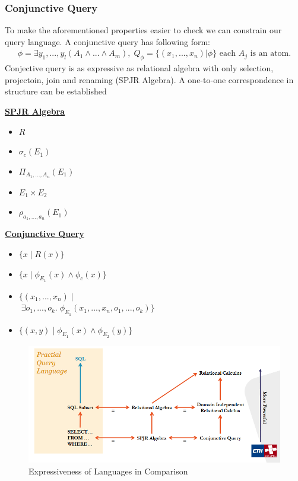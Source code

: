 \subsubsection{Conjunctive Query}
To make the aforementioned properties easier to check we can constrain our query language. 
A conjunctive query has following form:
\begin{align*}
\phi = \exists y_1, ..., y_l (A_1 \land ... \land A_m),\;Q_\phi = \{(x_1, ..., x_n) | \phi \} \text{ each $A_j$ is an atom.}
\end{align*}
Conjective query is as expressive as relational algebra with only selection, projectoin, join and renaming (SPJR Algebra). A one-to-one correspondence in structure can be established \vspace{.1cm}\\
\begin{framed}
\begin{minipage}[t]{.5\textwidth}
\centering
\textbf{\underline{SPJR Algebra}}
\begin{itemize}
\item $R$
\item $\sigma_c(E_1)$
\item $\Pi_{A_1, ..., A_n}(E_1)$
\item $E_1 \times E_2$
\item $\rho_{a_1, ..., a_n}(E_1)$
\end{itemize}
\end{minipage}
\begin{minipage}[t]{.5\textwidth}
\centering
\textbf{\underline{Conjunctive Query}}
\begin{itemize}
\item $\{x \mid R(x)\}$
\item $\{x \mid \phi_{E_1}(x) \land \phi_c(x)\}$
\item $\{(x_1, ..., x_n)\; |$\\$\;  \exists o_1, ..., o_k.\;\phi_{E_1} (x_1, ..., x_n, o_1, ..., o_k)\}$
\item $\{(x,y) \mid \phi_{E_1}(x) \land \phi_{E_2}(y)\}$
\end{itemize}
\end{minipage}
\end{framed}

\begin{figure}[H]
\centering
\includegraphics[width=.9\textwidth]{images/language_power.PNG}
\caption{Expressiveness of Languages in Comparison}
\label{Language_power}
\end{figure}

